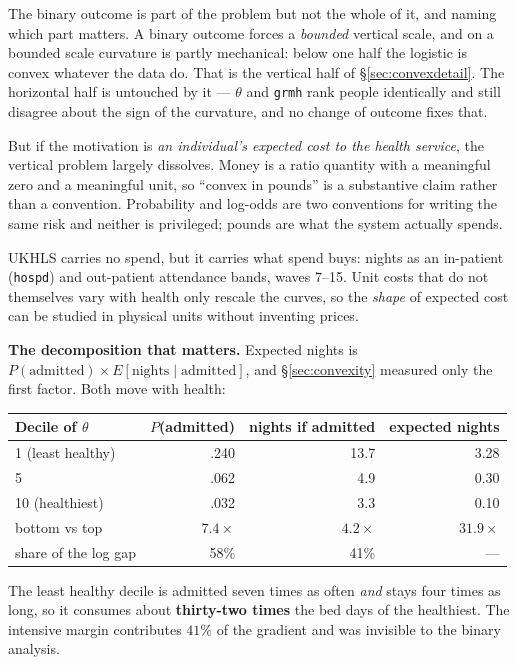 \documentclass[11pt]{article}
\newcommand{\code}[1]{\texttt{\small #1}}
\begin{document}
The binary outcome is part of the problem but not the whole of it, and
naming which part matters. A binary outcome forces a \emph{bounded} vertical
scale, and on a bounded scale curvature is partly mechanical: below one half
the logistic is convex whatever the data do. That is the vertical half of
\S\ref{sec:convexdetail}. The horizontal half is untouched by it --- $\theta$
and \code{grmh} rank people identically and still disagree about the sign of
the curvature, and no change of outcome fixes that.

But if the motivation is \emph{an individual's expected cost to the health
service}, the vertical problem largely dissolves. Money is a ratio quantity
with a meaningful zero and a meaningful unit, so ``convex in pounds'' is a
substantive claim rather than a convention. Probability and log-odds are two
conventions for writing the same risk and neither is privileged; pounds are
what the system actually spends.

UKHLS carries no spend, but it carries what spend buys: nights as an
in-patient (\code{hospd}) and out-patient attendance bands, waves 7--15. Unit
costs that do not themselves vary with health only rescale the curves, so the
\emph{shape} of expected cost can be studied in physical units without
inventing prices.

\textbf{The decomposition that matters.} Expected nights is
$P(\text{admitted}) \times E[\text{nights} \mid \text{admitted}]$, and
\S\ref{sec:convexity} measured only the first factor. Both move with health:

\begin{center}\small
\begin{tabular}{lrrr}
\toprule
Decile of $\theta$ & $P$(admitted) & nights if admitted & expected nights \\
\midrule
1 (least healthy) & .240 & 13.7 & 3.28 \\
5 & .062 & 4.9 & 0.30 \\
10 (healthiest) & .032 & 3.3 & 0.10 \\
\midrule
bottom vs top & $7.4\times$ & $4.2\times$ & $\mathbf{31.9\times}$ \\
share of the log gap & 58\% & 41\% & --- \\
\bottomrule
\end{tabular}
\end{center}

The least healthy decile is admitted seven times as often \emph{and} stays
four times as long, so it consumes about \textbf{thirty-two times} the bed
days of the healthiest. The intensive margin contributes $41\%$ of the
gradient and was invisible to the binary analysis.
\end{document}
